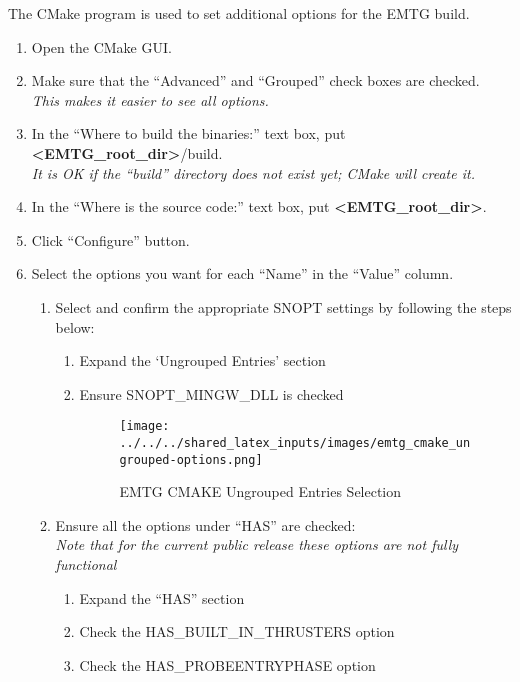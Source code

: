 
The CMake program is used to set additional options for the \ac{EMTG} build.

\begin{enumerate}
	\item Open the CMake \ac{GUI}.
	\item Make sure that the ``Advanced'' and ``Grouped'' check boxes are checked. \\ \emph{This makes it easier to see all options.}
	\item In the ``Where to build the binaries:'' text box, put \textbf{\textless EMTG\_root\_dir\textgreater}/build. \\ \emph{It is OK if the ``build'' directory does not exist yet; CMake will create it.}
	\item In the ``Where is the source code:'' text box, put \textbf{\textless EMTG\_root\_dir\textgreater}.
	\item Click ``Configure'' button.
	\item Select the options you want for each ``Name'' in the ``Value'' column. 
	\begin{enumerate}
		\item Select and confirm the appropriate SNOPT settings by following the steps below:
		\begin{enumerate}
			\item Expand the ‘Ungrouped Entries’ section
			\item Ensure SNOPT\_MINGW\_DLL is checked 
				\begin{figure}[H]
					\centering
					\texttt{[image: ../../../shared\_latex\_inputs/images/emtg\_cmake\_ungrouped-options.png]}
					\caption{EMTG CMAKE Ungrouped Entries Selection}
				\end{figure}
		\end{enumerate}
		\item Ensure all the options under ``HAS'' are checked: \\ \emph{Note that for the current public release these options are not fully functional}
		\begin{enumerate}
			\item Expand the ``HAS'' section
			\item Check the HAS\_BUILT\_IN\_THRUSTERS option
			\item Check the HAS\_PROBEENTRYPHASE option 
				\begin{figure}[H]
					\centering

\end{figure}
\end{enumerate}
\end{enumerate}
\end{enumerate}
